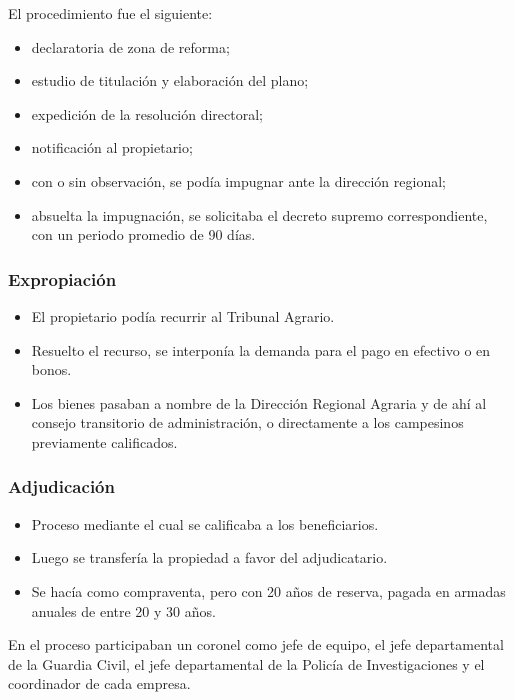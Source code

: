 \documentclass[
  man,
  floatsintext,
  longtable,
  a4paper,
  nolmodern,
  notxfonts,
  notimes,
  12pt,
  colorlinks=true,linkcolor=blue,citecolor=blue,urlcolor=blue]{apa7}
\providecommand{\tightlist}{%
  \setlength{\itemsep}{0pt}\setlength{\parskip}{0pt}}
\begin{document}
El procedimiento fue el siguiente:

\begin{itemize}
\tightlist
\item
  declaratoria de zona de reforma;
\item
  estudio de titulación y elaboración del plano;
\item
  expedición de la resolución directoral;
\item
  notificación al propietario;
\item
  con o sin observación, se podía impugnar ante la dirección regional;
\item
  absuelta la impugnación, se solicitaba el decreto supremo
  correspondiente, con un periodo promedio de 90 días.
\end{itemize}

\subsubsection{Expropiación}\label{expropiaciuxf3n}

\begin{itemize}
\tightlist
\item
  El propietario podía recurrir al Tribunal Agrario.
\item
  Resuelto el recurso, se interponía la demanda para el pago en efectivo
  o en bonos.
\item
  Los bienes pasaban a nombre de la Dirección Regional Agraria y de ahí
  al consejo transitorio de administración, o directamente a los
  campesinos previamente calificados.
\end{itemize}

\subsubsection{Adjudicación}\label{adjudicaciuxf3n}

\begin{itemize}
\tightlist
\item
  Proceso mediante el cual se calificaba a los beneficiarios.
\item
  Luego se transfería la propiedad a favor del adjudicatario.
\item
  Se hacía como compraventa, pero con 20 años de reserva, pagada en
  armadas anuales de entre 20 y 30 años.
\end{itemize}

En el proceso participaban un coronel como jefe de equipo, el jefe
departamental de la Guardia Civil, el jefe departamental de la Policía
de Investigaciones y el coordinador de cada empresa.
\end{document}
